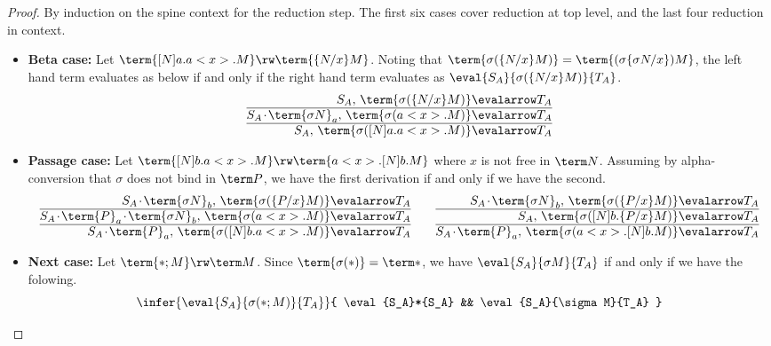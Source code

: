 \documentclass[a4paper,UKenglish,cleveref, autoref, thm-restate]{lipics-v2021}
\newcommand\case[1]{\textbf{#1}}
\newcommand\msep{\kern1pt{\cdot}\kern1pt}
\begin{document}
\begin{proof}
By induction on the spine context for the reduction step. The first six cases cover reduction at top level, and the last four reduction in context.

\begin{itemize}

\item\case{Beta case:} Let $\term{[N]a.a<x>.M}\rw\term{\{N/x\}M}$. Noting that $\term{\sigma(\{N/x\}M)}=\term{(\sigma\{\sigma N/x\})M}$, the left hand term evaluates as below if and only if the right hand term evaluates as $\eval{S_A}{\sigma(\{N/x\}M)}{T_A}$.
\[
\begin{array}{@{}r@{}l@{}}
	      \strut S_A                         ,\,    \term{\sigma(\{N/x\}M)} & {}\evalarrow T_A
\\ \hline \strut S_A \msep \term{\sigma N}_a ,\,      \term{\sigma(a<x>.M)} & {}\evalarrow T_A
\\ \hline \strut S_A                         ,\, \term{\sigma([N]a.a<x>.M)} & {}\evalarrow T_A
\end{array}
\]

\item\case{Passage case:} Let $\term{[N]b.a<x>.M}\rw\term{a<x>.[N]b.M}$ where $x$ is not free in $\term N$. Assuming by alpha-conversion that $\sigma$ does not bind in $\term P$, we have the first derivation if and only if we have the second.
\[
\begin{array}{@{}r@{}l@{}}
	      \strut S_A \msep \term{\sigma N}_b                  ,\,    \term{\sigma(\{P/x\}M)} & {}\evalarrow T_A
\\ \hline \strut S_A \msep \term{P}_a \msep \term{\sigma N}_b ,\,      \term{\sigma(a<x>.M)} & {}\evalarrow T_A
\\ \hline \strut S_A \msep \term{P}_a                         ,\, \term{\sigma([N]b.a<x>.M)} & {}\evalarrow T_A
\end{array}
\qquad
\begin{array}{@{}r@{}l@{}}
	      \strut S_A \msep \term{\sigma N}_b  ,\,      \term{\sigma(\{P/x\}M)} & {}\evalarrow T_A
\\ \hline \strut S_A                          ,\, \term{\sigma([N]b.\{P/x\}M)} & {}\evalarrow T_A
\\ \hline \strut S_A \msep \term{P}_a         ,\,   \term{\sigma(a<x>.[N]b.M)} & {}\evalarrow T_A
\end{array}
\]

\item\case{Next case:} Let $\term{*;M}\rw\term M$. Since $\term{\sigma(*)}=\term*$, we have $\eval{S_A}{\sigma M}{T_A}$ if and only if we have the folowing.
\[
\infer{ \eval{S_A}{\sigma(*;M)}{T_A} }{ \eval{S_A}*{S_A} && \eval{S_A}{\sigma M}{T_A} }
\]



\end{itemize}
\end{proof}
\end{document}

